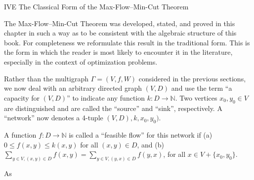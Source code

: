 IVE The Classical Form of the Max-Flow–Min-Cut Theorem

The Max-Flow–Min-Cut Theorem was developed, stated, and proved in this chapter in such a way as to be consistent with the algebraic structure of this book. For completeness we reformulate this result in the traditional form. This is the form in which the reader is most likely to encounter it in the literature, especially in the context of optimization problems.

Rather than the multigraph $\Gamma = (V, f, W)$ considered in the previous sections, we now deal with an arbitrary directed graph $(V, D)$ and use the term “a capacity for $(V, D)$” to indicate any function $k: D \rightarrow \mathbb{N}$. Two vertices $x_0, y_0 \in V$ are distinguished and are called the “source” and “sink”, respectively. A “network” now denotes a 4-tuple $(V, D), k, x_0, y_0)$.

A function $f: D \rightarrow \mathbb{N}$ is called a “feasible flow” for this network if
(a) $0 \leq f(x, y) \leq k(x, y)$ for all $(x, y) \in D$, and
(b) $\sum_{y \in V, (x, y) \in D} f(x, y) = \sum_{y \in V, (y, x) \in D} f(y, x)$, for all $x \in V + \{x_0, y_0\}$.

As
